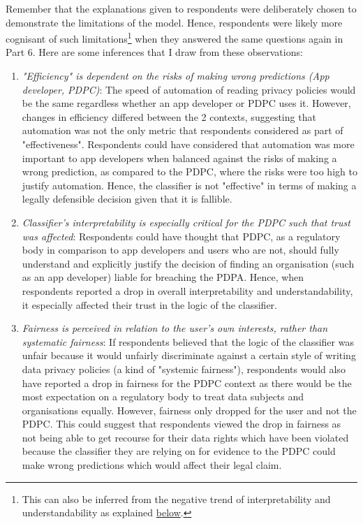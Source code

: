 Remember that the explanations given to respondents were deliberately chosen to demonstrate the limitations of the model. Hence, respondents were likely more cognisant of such limitations\footnote{This can also be inferred from the negative trend of interpretability and understandability as explained \hyperref[sec:interpret_understand]{below}.} when they answered the same questions again in Part 6. Here are some inferences that I draw from these observations:
\begin{enumerate}
    \item \textit{"Efficiency" is dependent on the risks of making wrong predictions (App developer, PDPC)}: The speed of automation of reading privacy policies would be the same regardless whether an app developer or PDPC uses it. However, changes in efficiency differed between the 2 contexts, suggesting that automation was not the only metric that respondents considered as part of "effectiveness". Respondents could have considered that automation was more important to app developers when balanced against the risks of making a wrong prediction, as compared to the PDPC, where the risks were too high to justify automation. Hence, the classifier is not "effective" in terms of making a legally defensible decision given that it is fallible.
    \item \textit{Classifier's interpretability is especially critical for the PDPC such that trust was affected}: Respondents could have thought that PDPC, as a regulatory body in comparison to app developers and users who are not, should fully understand and explicitly justify the decision of finding an organisation (such as an app developer) liable for breaching the PDPA. Hence, when respondents reported a drop in overall interpretability and understandability, it especially affected their trust in the logic of the classifier.
    \item \textit{Fairness is perceived in relation to the user's own interests, rather than systematic fairness}: If respondents believed that the logic of the classifier was unfair because it would unfairly discriminate against a certain style of writing data privacy policies (a kind of "systemic fairness"), respondents would also have reported a drop in fairness for the PDPC context as there would be the most expectation on a regulatory body to treat data subjects and organisations equally. However, fairness only dropped for the user and not the PDPC. This could suggest that respondents viewed the drop in fairness as not being able to get recourse for their data rights which have been violated because the classifier they are relying on for evidence to the PDPC could make wrong predictions which would affect their legal claim.

\end{enumerate}
